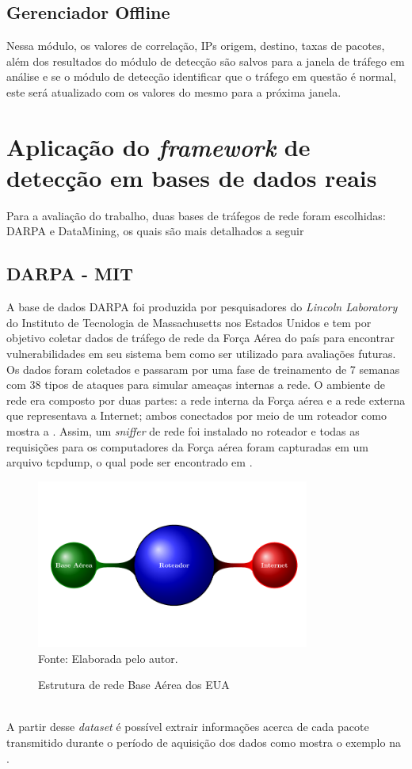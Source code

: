 \subsection{Gerenciador Offline}
Nessa módulo, os valores de correlação, IPs origem, destino, taxas de pacotes, além dos resultados do módulo de detecção são salvos para a janela de tráfego em análise e se o módulo de detecção identificar que o tráfego em questão é normal, este será atualizado com os valores do mesmo para a próxima janela.

\section{Aplicação do \textit{framework} de detecção em bases de dados reais}
\label{Sec:NaHiD_VERC}
Para a avaliação do trabalho, duas bases de tráfegos de rede foram escolhidas: DARPA e  DataMining, os quais são mais detalhados a seguir 
\subsection{DARPA - MIT}
 A base de dados DARPA foi produzida por pesquisadores do \textit{Lincoln Laboratory} do Instituto de Tecnologia de Massachusetts nos Estados Unidos e tem por objetivo coletar dados de tráfego de rede da Força Aérea do país para encontrar vulnerabilidades em seu sistema bem como ser utilizado para avaliações futuras. Os dados foram coletados e passaram por uma fase de treinamento de 7 semanas com 38 tipos de ataques para simular ameaças internas a rede. O ambiente de rede era composto por duas partes: a rede interna da Força aérea e a rede externa que representava a Internet; ambos conectados por meio de um roteador como mostra a .	Assim, um \textit{sniffer} de rede foi instalado no roteador e todas as requisições para os computadores da Força aérea foram capturadas em um arquivo tcpdump, o qual pode ser encontrado em \cite{siteDarpa}. 
 \begin{figure}[ht]
 	\centering
	\caption{Estrutura de rede Base Aérea dos EUA }
		\includegraphics[width=0.8\textwidth]{figs/darpaStructure.pdf}\\
	{Fonte: Elaborada pelo autor.}
	\label{fig:DARPA_Estrututra}
\end{figure}
\\
A partir desse \textit{dataset} é possível extrair informações acerca de cada pacote transmitido durante o período de aquisição dos dados como mostra o exemplo na .


